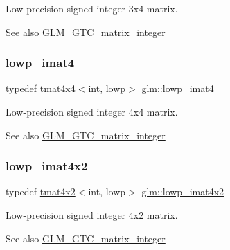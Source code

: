 Low-\/precision signed integer 3x4 matrix. \begin{DoxySeeAlso}{See also}
\hyperlink{group__gtc__matrix__integer}{G\+L\+M\+\_\+\+G\+T\+C\+\_\+matrix\+\_\+integer} 
\end{DoxySeeAlso}
\mbox{\label{group__gtc__matrix__integer_gad9a60f2ee78750d31b129c01096751b6}} 
\subsubsection{\texorpdfstring{lowp\+\_\+imat4}{lowp\_imat4}}
{\footnotesize\ttfamily typedef \hyperlink{structglm_1_1tmat4x4}{tmat4x4}$<$int, lowp$>$ \hyperlink{group__gtc__matrix__integer_gad9a60f2ee78750d31b129c01096751b6}{glm\+::lowp\+\_\+imat4}}

Low-\/precision signed integer 4x4 matrix. \begin{DoxySeeAlso}{See also}
\hyperlink{group__gtc__matrix__integer}{G\+L\+M\+\_\+\+G\+T\+C\+\_\+matrix\+\_\+integer} 
\end{DoxySeeAlso}
\mbox{\label{group__gtc__matrix__integer_ga87e2118b22cbc6916805aafcda52a943}} 
\subsubsection{\texorpdfstring{lowp\+\_\+imat4x2}{lowp\_imat4x2}}
{\footnotesize\ttfamily typedef \hyperlink{structglm_1_1tmat4x2}{tmat4x2}$<$int, lowp$>$ \hyperlink{group__gtc__matrix__integer_ga87e2118b22cbc6916805aafcda52a943}{glm\+::lowp\+\_\+imat4x2}}

Low-\/precision signed integer 4x2 matrix. \begin{DoxySeeAlso}{See also}
\hyperlink{group__gtc__matrix__integer}{G\+L\+M\+\_\+\+G\+T\+C\+\_\+matrix\+\_\+integer} 
\end{DoxySeeAlso}
\mbox{\label{group__gtc__matrix__integer_ga76c201715b216ddd5d7de3c3759211f1}} 
